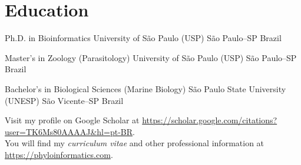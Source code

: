 \documentclass[11pt, letterpaper, sans]{moderncv}
\begin{document}

\vspace{-1em}

\section{Education}

{Ph.D. in Bioinformatics}
{University of São Paulo (USP)}
{São Paulo--SP}
{Brazil}
{}

{Master's in Zoology (Parasitology)}
{University of São Paulo (USP)}
{São Paulo--SP}
{Brazil}
{}

{Bachelor's in Biological Sciences (Marine Biology)}
{São Paulo State University (UNESP)}
{São Vicente--SP}
{Brazil}
{}

Visit my profile on Google Scholar at \url{https://scholar.google.com/citations?user=TK6Ms80AAAAJ&hl=pt-BR}.\\
You will find my \textit{curriculum vitae} and other professional information at \url{https://phyloinformatics.com}.
\end{document}
